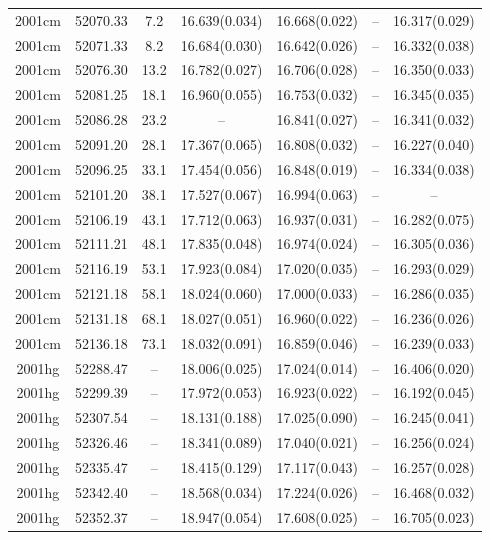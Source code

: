 \begin{table*}
\begin{tabular}{ccccccc}
2001cm	  & 52070.33	 & 7.2	& 16.639(0.034)	 & 16.668(0.022)	 & --	 & 16.317(0.029) \\ 
2001cm	  & 52071.33	 & 8.2	& 16.684(0.030)	 & 16.642(0.026)	 & --	 & 16.332(0.038) \\ 
2001cm	  & 52076.30	 & 13.2	& 16.782(0.027)	 & 16.706(0.028)	 & --	 & 16.350(0.033) \\ 
2001cm	  & 52081.25	 & 18.1	& 16.960(0.055)	 & 16.753(0.032)	 & --	 & 16.345(0.035) \\ 
2001cm	  & 52086.28	 & 23.2	& --	 & 16.841(0.027)	 & --	 & 16.341(0.032) \\ 
2001cm	  & 52091.20	 & 28.1	& 17.367(0.065)	 & 16.808(0.032)	 & --	 & 16.227(0.040) \\ 
2001cm	  & 52096.25	 & 33.1	& 17.454(0.056)	 & 16.848(0.019)	 & --	 & 16.334(0.038) \\ 
2001cm	  & 52101.20	 & 38.1	& 17.527(0.067)	 & 16.994(0.063)	 & --	 & -- \\ 
2001cm	  & 52106.19	 & 43.1	& 17.712(0.063)	 & 16.937(0.031)	 & --	 & 16.282(0.075) \\ 
2001cm	  & 52111.21	 & 48.1	& 17.835(0.048)	 & 16.974(0.024)	 & --	 & 16.305(0.036) \\ 
2001cm	  & 52116.19	 & 53.1	& 17.923(0.084)	 & 17.020(0.035)	 & --	 & 16.293(0.029) \\ 
2001cm	  & 52121.18	 & 58.1	& 18.024(0.060)	 & 17.000(0.033)	 & --	 & 16.286(0.035) \\ 
2001cm	  & 52131.18	 & 68.1	& 18.027(0.051)	 & 16.960(0.022)	 & --	 & 16.236(0.026) \\ 
2001cm	  & 52136.18	 & 73.1	& 18.032(0.091)	 & 16.859(0.046)	 & --	 & 16.239(0.033) \\ 
2001hg	  & 52288.47	 & --	& 18.006(0.025)	 & 17.024(0.014)	 & --	 & 16.406(0.020) \\ 
2001hg	  & 52299.39	 & --	& 17.972(0.053)	 & 16.923(0.022)	 & --	 & 16.192(0.045) \\ 
2001hg	  & 52307.54	 & --	& 18.131(0.188)	 & 17.025(0.090)	 & --	 & 16.245(0.041) \\ 
2001hg	  & 52326.46	 & --	& 18.341(0.089)	 & 17.040(0.021)	 & --	 & 16.256(0.024) \\ 
2001hg	  & 52335.47	 & --	& 18.415(0.129)	 & 17.117(0.043)	 & --	 & 16.257(0.028) \\ 
2001hg	  & 52342.40	 & --	& 18.568(0.034)	 & 17.224(0.026)	 & --	 & 16.468(0.032) \\ 
2001hg	  & 52352.37	 & --	& 18.947(0.054)	 & 17.608(0.025)	 & --	 & 16.705(0.023) \\ 

\end{tabular}
\end{table*}
